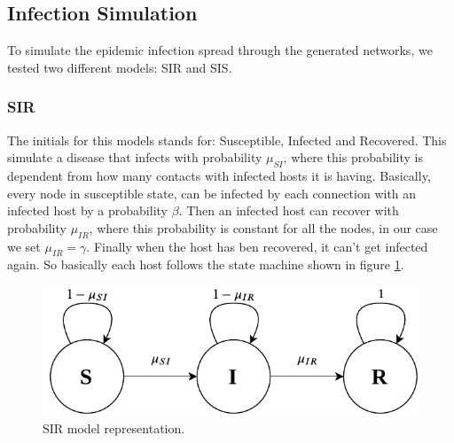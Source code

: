 \subsection{Infection Simulation}
To simulate the epidemic infection spread through the generated networks, we tested two different models: SIR and SIS.
\subsubsection{SIR}
The initials for this models stands for: Susceptible, Infected and Recovered. This simulate a disease that infects with probability $\mu_{SI}$, where this probability is dependent from how many contacts with infected hosts it is having. Basically, every node in susceptible state, can be infected by each connection with an infected host by a probability $\beta$. Then an infected host can recover with probability $\mu_{IR}$, where this probability is constant for all the nodes, in our case we set $\mu_{IR}=\gamma$. Finally when the host has ben recovered, it can't get infected again. So basically each host follows the state machine shown in figure \ref{fig:sir}.
\begin{figure}[htbp]
    \centering
    \includegraphics[width=\linewidth]{../img/SIR_model.pdf}
    \caption{SIR model representation.}
    \label{fig:sir}
\end{figure}

